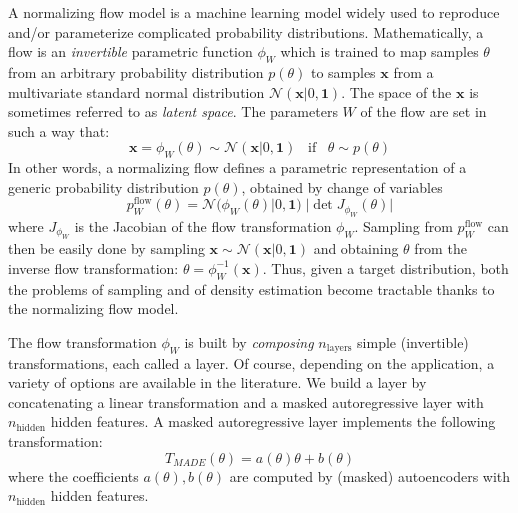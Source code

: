\documentclass[twocolumn,showpacs,preprintnumbers,nofootinbib,prd,
superscriptaddress,10pt]{revtex4-2}
\begin{document}
A normalizing flow model \cite{norm_flow, nflows_paper, Kobyzev_2021, Papamakarios_thesis} is a machine learning model widely used to reproduce and/or parameterize complicated probability distributions.
Mathematically, a flow is an {\it invertible} parametric function $\phi_W$ which is trained to map samples $\theta$ from an arbitrary probability distribution $p(\theta)$ to samples $\mathbf{x}$ from a multivariate standard normal distribution $\mathcal{N}(\mathbf{x}|0,\mathbf{1})$. The space of the $\mathbf{x}$ is sometimes referred to as {\it latent space}.
The parameters $W$ of the flow are set in such a way that:
\begin{equation}
	\mathbf{x} = \phi_W(\theta) \sim \mathcal{N}(\mathbf{x}|0,\mathbf{1}) \;\;\; \text{if} \;\;\;  \theta \sim p(\theta)
\end{equation}
%
In other words, a normalizing flow defines a parametric representation of a generic probability distribution $p(\theta)$, obtained by change of variables
\begin{equation}\label{eq:p_flow}
	p^\text{flow}_W(\theta) = \mathcal{N}(\phi_W(\theta)|0,\mathbf{1}) \; |\det J_{\phi_W}(\theta)|
\end{equation}
where $J_{\phi_W}$ is the Jacobian of the flow transformation $\phi_W$.
Sampling from $p^\text{flow}_W$ can then be easily done by sampling $\mathbf{x} \sim \mathcal{N}(\mathbf{x}|0,\mathbf{1})$ and obtaining $\theta$ from the inverse flow transformation: $\theta = \phi_W^{-1}(\mathbf{x})$.
Thus, given a target distribution, both the problems of sampling and of density estimation become tractable thanks to the normalizing flow model.

The flow transformation $\phi_W$ is built by {\it composing} $n_\text{layers}$ simple (invertible) transformations, each called a layer. Of course, depending on the application, a variety of options are available in the literature.
We build a layer by concatenating a linear transformation and a masked autoregressive layer \cite{MADE, MAF, MAF_bis} with $n_\text{hidden}$ hidden features.
A masked autoregressive layer implements the following transformation:
\begin{equation}
	T_{MADE}(\theta) = a(\theta)\theta+b(\theta)
\end{equation}
where the coefficients $a(\theta), b(\theta)$ are computed by (masked) autoencoders with $n_\text{hidden}$ hidden features.
\end{document}

